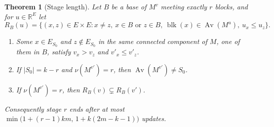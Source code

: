 \documentclass[11pt]{article}
\newtheorem{theorem}{Theorem}[section]
\newcommand{\R}{\mathbb R}
\newcommand{\blk}{\operatorname{blk}}
\newcommand{\Av}{\operatorname{Av}}
\begin{document}
\begin{theorem}[Stage length]
\label{thm:stagelength}
Let $B$ be a base of $M^{v}$ meeting exactly $r$ blocks, and for $u\in\R^{E}$ let
\[
  R_B(u)=\bigl\{(x,z)\in E\times E:x\ne z,\ x\in B\text{ or }z\in B,\
  \blk(x)\in\Av(M^{u}),\ u_x\le u_z\bigr\}.
\]
\begin{enumerate}
  \item Some $x\in E_{S_0}$ and $z\notin E_{S_0}$ in the same connected component of $M$,
        one of them in $B$, satisfy $v_x>v_z$ and $v'_x\le v'_z$.
  \item If $|S_0|=k-r$ and $\nu(M^{v'})=r$, then $\Av(M^{v'})\ne S_0$.
  \item If $\nu(M^{v'})=r$, then $R_B(v)\subsetneq R_B(v')$.
\end{enumerate}
Consequently stage $r$ ends after at most $\min\bigl(1+(r-1)km,\,1+k(2m-k-1)\bigr)$
updates.
\end{theorem}
\end{document}
